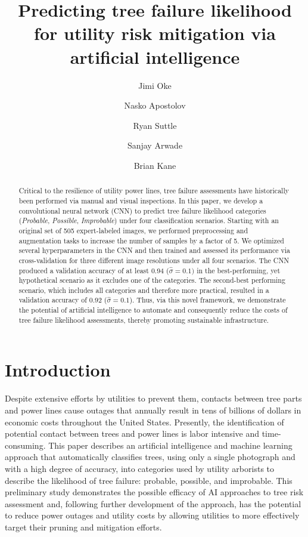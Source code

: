 \documentclass[NewProceedindgs, NoLineNumbers, SectionNumbers, letterpaper, SingleSpace, InsideFigs]{ascelike-new}
\begin{document}
\title{Predicting tree failure likelihood for utility risk mitigation via artificial intelligence}
\author[1]{Jimi Oke}
\author[1]{Nasko Apostolov}
\author[2]{Ryan Suttle}
\author[1]{Sanjay Arwade}
\author[2]{Brian Kane}


\maketitle

\begin{abstract}
  Critical to the resilience of utility power lines, tree failure assessments have historically been performed via
  manual and visual inspections.  In this paper, we develop a convolutional neural network (CNN) to predict tree failure
  likelihood categories (\textit{Probable}, \textit{Possible}, \textit{Improbable}) under four classification scenarios.
  Starting with an original set of 505 expert-labeled images, we performed preprocessing and augmentation tasks to
  increase the number of samples by a factor of 5. We optimized several hyperparameters in the CNN and then trained and assessed its performance via cross-validation
  for three different image resolutions under all four scenarios. The CNN produced a validation accuracy of at least 0.94
  ($\hat\sigma = 0.1)$ in the best-performing, yet hypothetical scenario as it excludes one of the categories.  The
  second-best performing scenario, which includes all categories and therefore more practical, resulted in a validation
  accuracy of 0.92 ($\hat\sigma = 0.1$). Thus, via this novel framework, we demonstrate the potential of artificial
  intelligence to automate and consequently reduce the costs of tree failure likelihood assessments, thereby promoting
  sustainable infrastructure.
\end{abstract}

\section{Introduction}
Despite extensive efforts by utilities to prevent them, contacts between tree parts and power lines cause outages that annually result in tens of billions of dollars in economic costs throughout the United States.  Presently, the identification of potential contact between trees and power lines is labor intensive and time-consuming.  This paper describes an artificial intelligence and machine learning approach that automatically classifies trees, using only a single photograph and with a high degree of accuracy, into categories used by utility arborists to describe the likelihood of tree failure: probable, possible, and improbable.  This preliminary study demonstrates the possible efficacy of AI approaches to tree risk assessment and, following further development of the approach, has the potential to reduce power outages and utility costs by allowing utilities to more effectively target their pruning and mitigation efforts.  
\end{document}

